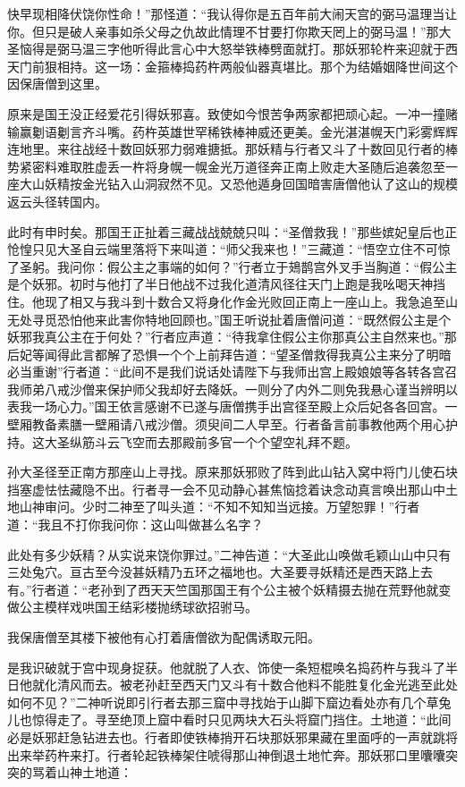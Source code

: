 \documentclass[12pt,UTF8]{ctexbook}
\begin{document}
{	快早现相降伏饶你性命！”那怪道：“我认得你是五百年前大闹天宫的弼马温理当让你。但只是破人亲事如杀父母之仇故此情理不甘要打你欺天罔上的弼马温！”那大圣恼得是弼马温三字他听得此言心中大怒举铁棒劈面就打。那妖邪轮杵来迎就于西天门前狠相持。这一场：金箍棒捣药杵两般仙器真堪比。那个为结婚姻降世间这个因保唐僧到这里。
	
	原来是国王没正经爱花引得妖邪喜。致使如今恨苦争两家都把顽心起。一冲一撞赌输赢劖语劖言齐斗嘴。药杵英雄世罕稀铁棒神威还更美。金光湛湛幌天门彩雾辉辉连地里。来往战经十数回妖邪力弱难搪抵。那妖精与行者又斗了十数回见行者的棒势紧密料难取胜虚丢一杵将身幌一幌金光万道径奔正南上败走大圣随后追袭忽至一座大山妖精按金光钻入山洞寂然不见。又恐他遁身回国暗害唐僧他认了这山的规模返云头径转国内。
	
	此时有申时矣。那国王正扯着三藏战战兢兢只叫：“圣僧救我！”那些嫔妃皇后也正怆惶只见大圣自云端里落将下来叫道：“师父我来也！”三藏道：“悟空立住不可惊了圣躬。我问你：假公主之事端的如何？”行者立于鳷鹊宫外叉手当胸道：“假公主是个妖邪。初时与他打了半日他战不过我化道清风径往天门上跑是我吆喝天神挡住。他现了相又与我斗到十数合又将身化作金光败回正南上一座山上。我急追至山无处寻觅恐怕他来此害你特地回顾也。”国王听说扯着唐僧问道：“既然假公主是个妖邪我真公主在于何处？”行者应声道：“待我拿住假公主你那真公主自然来也。”那后妃等闻得此言都解了恐惧一个个上前拜告道：“望圣僧救得我真公主来分了明暗必当重谢”行者道：“此间不是我们说话处请陛下与我师出宫上殿娘娘等各转各宫召我师弟八戒沙僧来保护师父我却好去降妖。一则分了内外二则免我悬心谨当辨明以表我一场心力。”国王依言感谢不已遂与唐僧携手出宫径至殿上众后妃各各回宫。一壁厢教备素膳一壁厢请八戒沙僧。须臾间二人早至。行者备言前事教他两个用心护持。这大圣纵筋斗云飞空而去那殿前多官一个个望空礼拜不题。
	
	孙大圣径至正南方那座山上寻找。原来那妖邪败了阵到此山钻入窝中将门儿使石块挡塞虚怯怯藏隐不出。行者寻一会不见动静心甚焦恼捻着诀念动真言唤出那山中土地山神审问。少时二神至了叫头道：“不知不知知当远接。万望恕罪！”行者道：“我且不打你我问你：这山叫做甚么名字？
	
	此处有多少妖精？从实说来饶你罪过。”二神告道：“大圣此山唤做毛颖山山中只有三处兔穴。亘古至今没甚妖精乃五环之福地也。大圣要寻妖精还是西天路上去有。”行者道：“老孙到了西天天竺国那国王有个公主被个妖精摄去抛在荒野他就变做公主模样戏哄国王结彩楼抛绣球欲招驸马。
	
	我保唐僧至其楼下被他有心打着唐僧欲为配偶诱取元阳。
	
	是我识破就于宫中现身捉获。他就脱了人衣、饰使一条短棍唤名捣药杵与我斗了半日他就化清风而去。被老孙赶至西天门又斗有十数合他料不能胜复化金光逃至此处如何不见？”二神听说即引行者去那三窟中寻找始于山脚下窟边看处亦有几个草兔儿也惊得走了。寻至绝顶上窟中看时只见两块大石头将窟门挡住。土地道：“此间必是妖邪赶急钻进去也。行者即使铁棒捎开石块那妖邪果藏在里面呼的一声就跳将出来举药杵来打。行者轮起铁棒架住唬得那山神倒退土地忙奔。那妖邪口里囔囔突突的骂着山神土地道：
	
}
\end{document}
